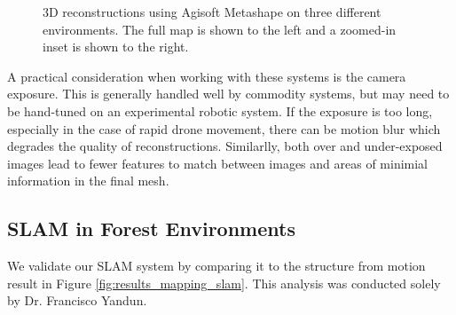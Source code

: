 \begin{figure}[H]
    \hfill
    \caption{3D reconstructions using Agisoft Metashape on three different environments. The full map is shown to the left and a zoomed-in inset is shown to the right.}
    \label{fig:results:sfm}
\end{figure}

A practical consideration when working with these systems is the camera exposure. This is generally handled well by commodity systems, but may need to be hand-tuned on an experimental robotic system. If the exposure is too long, especially in the case of rapid drone movement, there can be motion blur which degrades the quality of reconstructions. Similarlly, both over and under-exposed images lead to fewer features to match between images and areas of minimial information in the final mesh.  

\subsection{SLAM in Forest Environments}

We validate our SLAM system by comparing it to the structure from motion result in Figure \ref{fig:results_mapping_slam}. This analysis was conducted solely by Dr. Francisco Yandun. 

